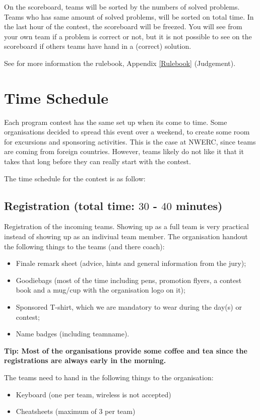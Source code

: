 On the scoreboard, teams will be sorted by the numbers of solved problems. Teams who has same amount of solved problems, will be sorted on total time. In the last hour of the contest, the scoreboard will be freezed. You will see from your own team if a problem is correct or not, but it is not possible to see on the scoreboard if others teams have hand in a (correct) solution.

See for more information the rulebook, Appendix \ref{Rulebook} (Judgement).

\section{Time Schedule}
Each program contest has the same set up when its come to time. Some organisations decided to spread this event over a weekend, to create some room for excursions and sponsoring activities. This is the case at NWERC, since teams are coming from foreign countries. However, teams likely do not like it that it takes that long before they can really start with the contest.

The time schedule for the contest is as follow:
\subsection{Registration (total time: $30$ - $40$ minutes)}
Registration of the incoming teams. Showing up as a full team is very practical instead of showing up as an indiviual team member. The organisation handout the following things to the teams (and there coach):
\begin{itemize}
\item Finale remark sheet (advice, hints and general information from the jury);
\item Goodiebags (most of the time including pens, promotion flyers, a contest book and a mug/cup with the organisation logo on it);
\item Sponsored T-shirt, which we are mandatory to wear during the day(s) or contest;
\item Name badges (including teamname).
\end{itemize}
\textbf{Tip: Most of the organisations provide some coffee and tea since the registrations are always early in the morning.}

The teams need to hand in the following things to the organisation:
\begin{itemize}
\item Keyboard (one per team, wireless is not accepted)
\item Cheatsheets (maximum of $3$ per team)
\end{itemize}

